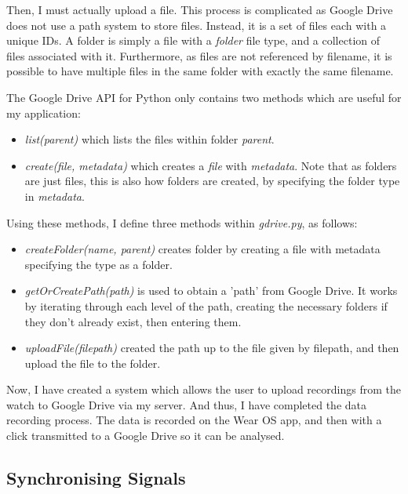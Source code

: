 \documentclass[12pt,a4paper,twoside,openright]{report}
\begin{document}
Then, I must actually upload a file. This process is complicated as Google
Drive does not use a path system to store files. Instead, it is a set of files
each with a unique IDs. A folder is simply a file with a \emph{folder} file
type, and a collection of files associated with it. Furthermore, as files are
not referenced by filename, it is possible to have multiple files in the same
folder with exactly the same filename.

The Google Drive API for Python only contains two methods which are useful for
my application:

\begin{itemize}
	\item \emph{list(parent)} which lists the files within folder
		\emph{parent}.

	\item \emph{create(file, metadata)} which creates a \emph{file} with
		\emph{metadata}. Note that as folders
		are just files, this is also how folders are created, by
		specifying the folder type in \emph{metadata}.
\end{itemize}

Using these methods, I define three methods within \emph{gdrive.py}, as follows:

\begin{itemize}
	\item \emph{createFolder(name, parent)} creates folder by creating a
		file with metadata specifying the type as a folder.

	\item \emph{getOrCreatePath(path)} is used to obtain a 'path' from Google
		Drive. It works by iterating through each level of the path,
		creating the necessary folders if they don't already exist,
		then entering them.

	\item \emph{uploadFile(filepath)} created the path up to the file
		given by filepath, and then upload the file to the folder.
\end{itemize}

Now, I have created a system which allows the user to upload recordings from
the watch to Google Drive via my server. And thus, I have completed the data
recording process. The data is recorded on the Wear OS app, and then with a
click transmitted to a Google Drive so it can be analysed.

\subsection{Synchronising Signals} \label{sec:sync}
\end{document}
